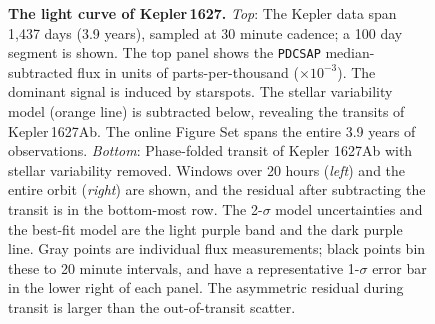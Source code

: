\documentclass[12pt,modern,twocolumn,tighten]{aastex63}
\newcommand{\pn}{Kepler\,1627Ab} %
\begin{document}
\begin{figure}[tp]
\begin{center}
		\vspace{-0.2cm}	
	\end{center}
	\vspace{-0.7cm}
  \caption{ {\bf The light curve of Kepler\,1627.}
    {\it Top}: 
    The Kepler data span 1{,}437 days (3.9 years), sampled at 30
    minute cadence;  a 100 day segment is shown.  The top panel shows
    the \texttt{PDCSAP} median-subtracted flux in units of
    parts-per-thousand ($\times 10^{-3}$).  The dominant signal is
    induced by starspots.  The stellar variability model (orange line)
    is subtracted below, revealing the transits of \pn.  The online
    Figure Set spans the entire 3.9 years of observations.
    {\it Bottom}:
    Phase-folded transit of Kepler 1627Ab with stellar variability
    removed.  Windows over 20 hours ({\it left}) and the entire orbit
    ({\it right}) are shown, and the residual after subtracting the
    transit is in the bottom-most row.  The 2-$\sigma$ model uncertainties
    and the best-fit model are the light purple band and the dark
    purple line.  Gray points are individual flux measurements; black
    points bin these to 20 minute intervals, and have a representative
    1-$\sigma$ error bar in the lower right of each panel.  The asymmetric
    residual during transit is larger than the out-of-transit scatter.
    \label{fig:lc}
  }
\end{figure}
\end{document}
